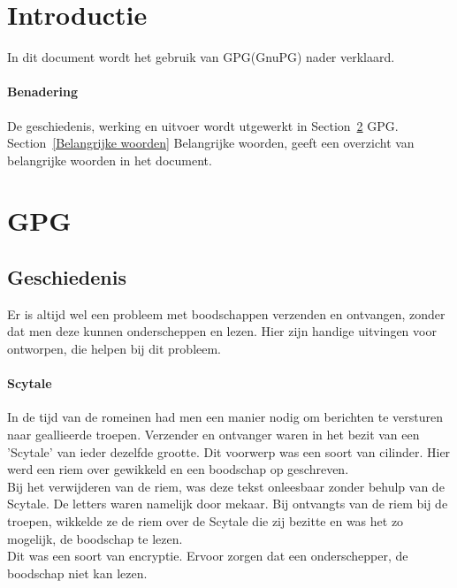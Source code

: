 \documentclass[12pt]{article}
\begin{document}
\maketitle
\newpage
\tableofcontents
\newpage

\section{Introductie}
In dit document wordt het gebruik van GPG(GnuPG) nader verklaard.

\paragraph{Benadering}
De geschiedenis, werking en uitvoer wordt utgewerkt in Section~\ref{GPG} GPG.\\
Section~\ref{Belangrijke woorden} Belangrijke woorden, geeft een overzicht van belangrijke woorden in het document.

\section{GPG}\label{GPG}

\subsection{Geschiedenis}
Er is altijd wel een probleem met boodschappen verzenden en ontvangen, zonder dat men deze kunnen onderscheppen en lezen. Hier zijn handige uitvingen voor ontworpen, die helpen bij dit probleem.

\paragraph{Scytale}
In de tijd van de romeinen had men een manier nodig om berichten te versturen naar geallieerde troepen. Verzender en ontvanger waren in het bezit van een 'Scytale' van ieder dezelfde grootte. Dit voorwerp was een soort van cilinder. Hier werd een riem over gewikkeld en een boodschap op geschreven.\\
Bij het verwijderen van de riem, was deze tekst onleesbaar zonder behulp van de Scytale. De letters waren namelijk door mekaar. Bij ontvangts van de riem bij de troepen, wikkelde ze de riem over de Scytale die zij bezitte en was het zo mogelijk, de boodschap te lezen.\\
Dit was een soort van encryptie. Ervoor zorgen dat een onderschepper, de boodschap niet kan lezen.
\end{document}
